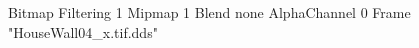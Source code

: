 {Bitmap
	{Filtering 1}
	{Mipmap 1}
	{Blend none}
	{AlphaChannel 0}
	{Frame "HouseWall04_x.tif.dds"}
}
